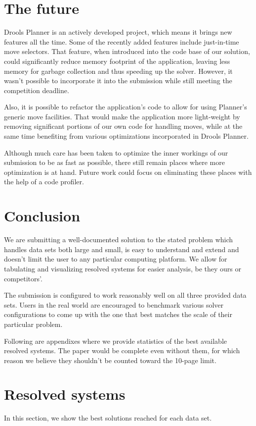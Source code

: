 \documentclass[10pt,a4paper,final]{article}
\begin{document}


\section{The future}

Drools Planner is an actively developed project, which means it brings new features all the time. Some of the recently added features include just-in-time move selectors. That feature, when introduced into the code base of our solution, could significantly reduce memory footprint of the application, leaving less memory for garbage collection and thus speeding up the solver. However, it wasn't possible to incorporate it into the submission while still meeting the competition deadline.

Also, it is possible to refactor the application's code to allow for using Planner's generic move facilities. That would make the application more light-weight by removing significant portions of our own code for handling moves, while at the same time benefiting from various optimizations incorporated in Drools Planner.

Although much care has been taken to optimize the inner workings of our submission to be as fast as possible, there still remain places where more optimization is at hand. Future work could focus on eliminating these places with the help of a code profiler.

\section{Conclusion}

We are submitting a well-documented solution to the stated problem which handles data sets both large and small, is easy to understand and extend and doesn't limit the user to any particular computing platform. We allow for tabulating and visualizing resolved systems for easier analysis, be they ours or competitors'.

The submission is configured to work reasonably well on all three provided data sets. Users in the real world are encouraged to benchmark various solver configurations to come up with the one that best matches the scale of their particular problem.

\appendix

Following are appendixes where we provide statistics of the best available resolved systems. The paper would be complete even without them, for which reason we believe they shouldn't be counted toward the 10-page limit.

\section{Resolved systems}

In this section, we show the best solutions reached for each data set. 




\end{document}
